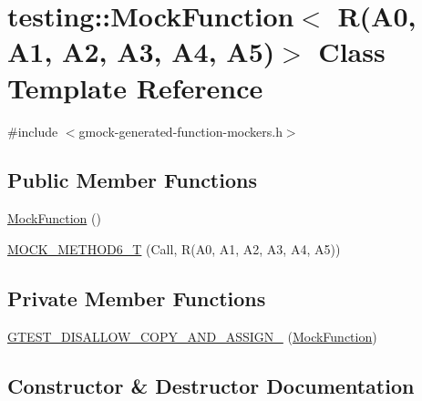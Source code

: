 \hypertarget{classtesting_1_1_mock_function_3_01_r_07_a0_00_01_a1_00_01_a2_00_01_a3_00_01_a4_00_01_a5_08_4}{}\section{testing\+::Mock\+Function$<$ R(A0, A1, A2, A3, A4, A5)$>$ Class Template Reference}
\label{classtesting_1_1_mock_function_3_01_r_07_a0_00_01_a1_00_01_a2_00_01_a3_00_01_a4_00_01_a5_08_4}


{\ttfamily \#include $<$gmock-\/generated-\/function-\/mockers.\+h$>$}

\subsection*{Public Member Functions}
\begin{DoxyCompactItemize}
\item 
\mbox{\hyperlink{classtesting_1_1_mock_function_3_01_r_07_a0_00_01_a1_00_01_a2_00_01_a3_00_01_a4_00_01_a5_08_4_ae3e91041351fafbab8746662cc2fe8d6}{Mock\+Function}} ()
\item 
\mbox{\hyperlink{classtesting_1_1_mock_function_3_01_r_07_a0_00_01_a1_00_01_a2_00_01_a3_00_01_a4_00_01_a5_08_4_ae66d20991ea3ab7d2b817c54df80653e}{M\+O\+C\+K\+\_\+\+M\+E\+T\+H\+O\+D6\+\_\+T}} (Call, R(A0, A1, A2, A3, A4, A5))
\end{DoxyCompactItemize}
\subsection*{Private Member Functions}
\begin{DoxyCompactItemize}
\item 
\mbox{\hyperlink{classtesting_1_1_mock_function_3_01_r_07_a0_00_01_a1_00_01_a2_00_01_a3_00_01_a4_00_01_a5_08_4_a7634bc385fc1b89e053b991ec8672df9}{G\+T\+E\+S\+T\+\_\+\+D\+I\+S\+A\+L\+L\+O\+W\+\_\+\+C\+O\+P\+Y\+\_\+\+A\+N\+D\+\_\+\+A\+S\+S\+I\+G\+N\+\_\+}} (\mbox{\hyperlink{classtesting_1_1_mock_function}{Mock\+Function}})
\end{DoxyCompactItemize}


\subsection{Constructor \& Destructor Documentation}
\mbox{\label{classtesting_1_1_mock_function_3_01_r_07_a0_00_01_a1_00_01_a2_00_01_a3_00_01_a4_00_01_a5_08_4_ae3e91041351fafbab8746662cc2fe8d6}} 
